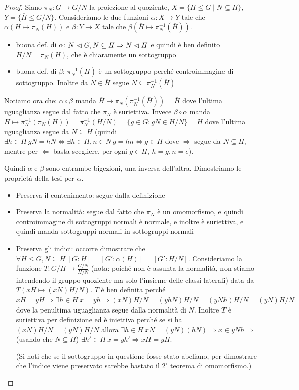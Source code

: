 \begin{proof}
    Siano $\pi_N: G \rightarrow G/N$ la proiezione al quoziente, $X  = \{ H \leq G \mid N \subseteq H \}$, $Y = \{ \overline H \leq G/N \}$. Consideriamo le due funzioni $\alpha: X \rightarrow Y$ tale che $\alpha(H \mapsto \pi_N(H))$ e $\beta: Y \rightarrow X$ tale che $\beta( \overline H \mapsto \pi_N^{-1}(\overline H) )$. 
    \begin{itemize}
        \item buona def. di $\alpha$: $N \vartriangleleft G, N \subseteq H \Rightarrow N \vartriangleleft H$ e quindi è ben definito $H/N = \pi_N(H)$, che è chiaramente un sottogruppo
        \item buona def. di $\beta$: $\pi_N^{-1}(\overline H)$ è un sottogruppo perché controimmagine di sottogruppo. Inoltre da $N \in \overline H$ segue $N \subseteq \pi_N^{-1}(\overline H)$
    \end{itemize}
    Notiamo ora che: $\alpha \circ \beta$ manda $\overline H \mapsto  \pi_N(\pi_N^{-1}(\overline H)) = \overline H$ dove l'ultima uguaglianza segue dal fatto che $\pi_N$ è suriettiva. Invece $ \beta \circ \alpha$ manda 
    $H \mapsto  \pi_N^{-1}(\pi_N(H)) = \pi_N^{-1}(H/N) = \{g \in G : gN \in H/N \} =  H$
    dove l'ultima uguaglianza segue da $N \subseteq H$ (quindi $\exists h \in H \ gN = hN \iff \exists h \in H, n \in N \  g = hn \iff g \in H$ dove $\Rightarrow$ segue da $N \subseteq H$, mentre per $\Leftarrow$ basta scegliere, per ogni $g \in H$, $h = g, n = e$).
    
    Quindi $\alpha$ e $\beta$ sono entrambe bigezioni, una inversa dell'altra. Dimostriamo le proprietà della tesi per $\alpha$.
    \begin{itemize}
        \item Preserva il contenimento: segue dalla definizione
        \item Preserva la normalità: segue dal fatto che $\pi_N$ è un omomorfismo, e quindi controimmagine di sottogruppi normali è normale, e inoltre è suriettiva, e quindi manda sottogruppi normali in sottogruppi normali
        \item Preserva gli indici:  occorre dimostrare che $\forall H \leq G , N \subseteq H \ [G:H] = [G' : \alpha(H)] = [G' : H/N]$. Consideriamo la funzione $T: G/H \rightarrow \frac{G/N}{H/N}$ (nota: poiché non è assunta la normalità, non stiamo intendendo il gruppo quoziente ma solo l'insieme delle classi laterali) data da $T(xH \mapsto (xN)H/N)$. $T$ è ben definita perché $xH = yH \Rightarrow \exists h \in H \ x = yh \Rightarrow (xN)H/N = (yhN)H/N = (yNh)H/N = (yN)H/N$ dove la penultima uguaglianza segue dalla normalità di $N$. Inoltre $T$ è suriettiva per definizione ed è iniettiva perché se si ha $(xN)H/N = (yN)H/N$ allora $\exists h \in H \ xN = (yN) (hN) \Rightarrow x \in yNh \Rightarrow$ (usando che $N\subseteq H$) $\exists h' \in H \ x = yh' \Rightarrow xH = yH$.
        
        (Si noti che se il sottogruppo in questione fosse stato abeliano, per dimostrare che l'indice viene preservato sarebbe bastato il $2^{\circ}$ teorema di omomorfismo.)
    \end{itemize}
\end{proof}
